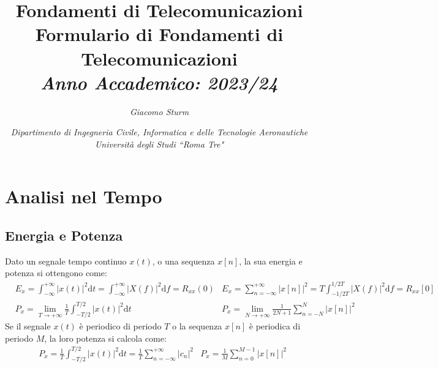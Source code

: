 \documentclass{article}
\author{}
\date{}
\newcommand{\df}{\mathrm{d}}
\newcommand{\intinf}{\displaystyle\int_{-\infty}^{+\infty}}
\newcommand{\suminf}{\displaystyle\sum_{n=-\infty}^{+\infty}}
\newcommand{\intp}{\displaystyle\frac{1}{T}\int_{-T/2}^{T/2}}
\begin{document}
\title{%
    \textbf{Fondamenti di Telecomunicazioni}  \\ 
    \large Formulario di Fondamenti di Telecomunicazioni\\
    \textit{Anno Accademico: 2023/24}}
\author{\textit{Giacomo Sturm}}
\date{\textit{Dipartimento di Ingegneria Civile, Informatica e delle Tecnologie Aeronautiche \\
Università degli Studi ``Roma Tre"}}

\maketitle
\pagestyle{fancy}
\fancyhead{}\fancyfoot{}
\fancyfoot[C]{\thepage}
\section{Analisi nel Tempo}

\subsection*{Energia e Potenza}
Dato un segnale tempo continuo $x(t)$, o una sequenza $x[n]$, la sua energia e potenza si ottengono come:
\begin{align*}
    &E_x=\intinf|x(t)|^2\df t=\intinf |X(f)|^2\df f=R_{xx}(0)&E_x=\suminf|x[n]|^2=T\int_{-1/2T}^{1/2T}|X(f)|^2\df f=R_{xx}[0]\\
    &P_x=\lim_{T\to+\infty}\intp|x(t)|^2\df t&P_x=\displaystyle\lim_{N\to+\infty}\frac{1}{2N+1}\sum_{n=-N}^N|x[n]|^2
\end{align*}
Se il segnale $x(t)$ è periodico di periodo $T$ o la sequenza $x[n]$ è periodica di periodo $M$, la loro potenza si calcola come:
\begin{align*}
    &P_x=\displaystyle\frac{1}{T}\int_{-T/2}^{T/2}|x(t)|^2\df t=\frac{1}{T}\suminf |c_n|^2&P_x=\displaystyle\frac{1}{M}\sum_{n=0}^{M-1}|x[n]|^2
\end{align*}
\end{document}
